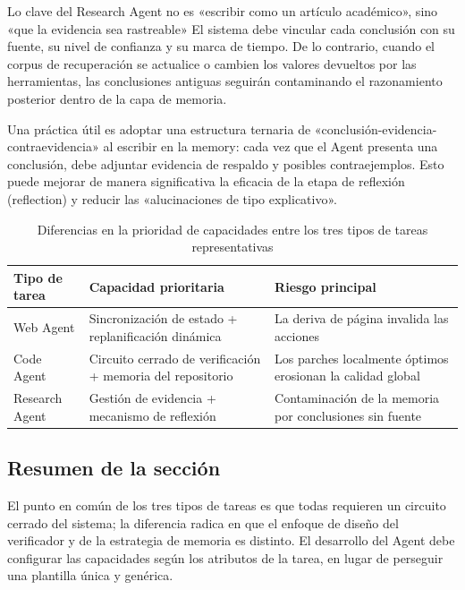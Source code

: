 \begin{importantbox}{Lo clave del Research Agent no es «escribir como un artículo académico», sino «que la evidencia sea rastreable»}
El sistema debe vincular cada conclusión con su fuente, su nivel de confianza y su marca de tiempo. De lo contrario, cuando el corpus de recuperación se actualice o cambien los valores devueltos por las herramientas, las conclusiones antiguas seguirán contaminando el razonamiento posterior dentro de la capa de memoria.
\end{importantbox}

Una práctica útil es adoptar una estructura ternaria de «conclusión-evidencia-contraevidencia» al escribir en la memory: cada vez que el Agent presenta una conclusión, debe adjuntar evidencia de respaldo y posibles contraejemplos. Esto puede mejorar de manera significativa la eficacia de la etapa de reflexión (reflection) y reducir las «alucinaciones de tipo explicativo».

\begin{table}[H]
\centering
\begin{tabular}{p{2.7cm}p{3.9cm}p{4.4cm}}
\toprule
\textbf{Tipo de tarea} & \textbf{Capacidad prioritaria} & \textbf{Riesgo principal} \\
\midrule
Web Agent & Sincronización de estado + replanificación dinámica & La deriva de página invalida las acciones \\
Code Agent & Circuito cerrado de verificación + memoria del repositorio & Los parches localmente óptimos erosionan la calidad global \\
Research Agent & Gestión de evidencia + mecanismo de reflexión & Contaminación de la memoria por conclusiones sin fuente \\
\bottomrule
\end{tabular}
\caption{Diferencias en la prioridad de capacidades entre los tres tipos de tareas representativas}
\end{table}

\subsection{Resumen de la sección}
El punto en común de los tres tipos de tareas es que todas requieren un circuito cerrado del sistema; la diferencia radica en que el enfoque de diseño del verificador y de la estrategia de memoria es distinto. El desarrollo del Agent debe configurar las capacidades según los atributos de la tarea, en lugar de perseguir una plantilla única y genérica.

